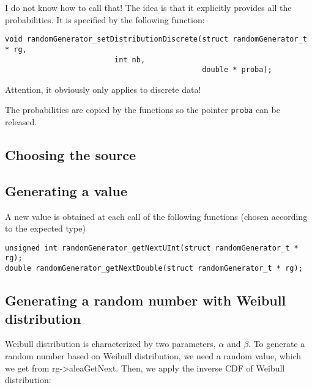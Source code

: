    I do not know how to call that! The idea is that it explicitly provides 
all the probabilities. It is specified by the following function:
   
\begin{verbatim}
void randomGenerator_setDistributionDiscrete(struct randomGenerator_t * rg,
					     int nb,
                                             double * proba);
\end{verbatim}
   
   Attention, it obviously only applies to discrete data!

   The probabilities are copied by the functions so the pointer
{\tt proba} can be released.

%
\subsection{Choosing the source}

%
\subsection{Generating a value}


   A new value is obtained at each call of the following functions 
(chosen according to the expected type)

\begin{verbatim}
unsigned int randomGenerator_getNextUInt(struct randomGenerator_t * rg);
double randomGenerator_getNextDouble(struct randomGenerator_t * rg);
\end{verbatim}

\subsection{Generating a random number with Weibull distribution}
\label{weibull_dist}

Weibull distribution is characterized by two parameters, $\alpha$ and $\beta$.
To generate a random number based on Weibull distribution, we need a random value, which we get from rg->aleaGetNext. Then, we apply the inverse CDF of Weibull distribution:

